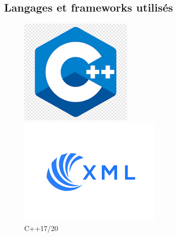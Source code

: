 \subsection*{Langages et frameworks utilisés}
\begin{figure}[hbt!]
  \centering
  \begin{minipage}[b]{0.18\textwidth}
    \includegraphics[width=\textwidth]{images_pfe/c+++.png}
    \caption{C++17/20}
  \end{minipage}\hfill
  \begin{minipage}[b]{0.18\textwidth}
    \includegraphics[width=\textwidth]{images_pfe/xml.png}

\end{minipage}
\end{figure}
